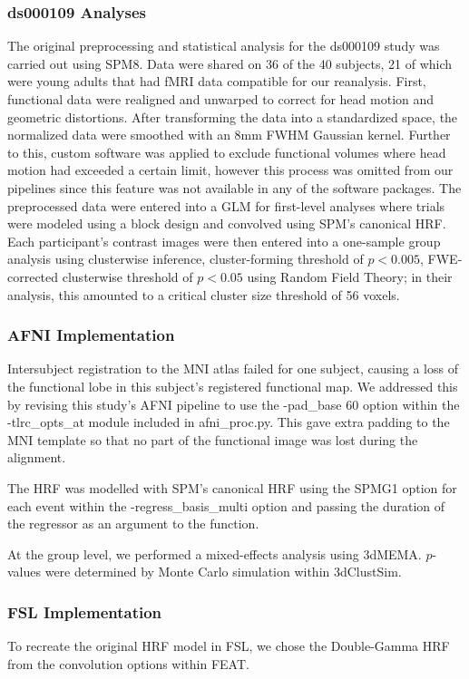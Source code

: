 \subsubsection{ds000109 Analyses}
The original preprocessing and statistical analysis for the ds000109 study was carried out using SPM8. Data were shared on 36 of the 40 subjects, 21 of which were young adults that had fMRI data compatible for our reanalysis. First, functional data were realigned and unwarped to correct for head motion and geometric distortions. After transforming the data into a standardized space, the normalized data were smoothed with an 8mm FWHM Gaussian kernel. Further to this, custom software was applied to exclude functional volumes where head motion had exceeded a certain limit, however this process was omitted from our pipelines since this feature was not available in any of the software packages. The preprocessed data were entered into a GLM for first-level analyses where trials were modeled using a block design and convolved using SPM's canonical HRF. Each participant's contrast images were then entered into a one-sample group analysis using clusterwise inference, cluster-forming threshold of $p < 0.005$, FWE-corrected clusterwise threshold of $p < 0.05$ using Random Field Theory; in their analysis, this amounted to a critical cluster size threshold of 56 voxels. 

\subsubsection{AFNI Implementation}
Intersubject registration to the MNI atlas failed for one subject, causing a loss of the functional lobe in this subject's registered functional map. We addressed this by revising this study's AFNI pipeline to use the -pad\_base 60 option within the -tlrc\_opts\_at module included in afni\_proc.py. This gave extra padding to the MNI template so that no part of the functional image was lost during the alignment. 

The HRF was modelled with SPM's canonical HRF using the SPMG1 option for each event within the -regress\_basis\_multi option and passing the duration of the regressor as an argument to the function.

At the group level, we performed a mixed-effects analysis using 3dMEMA. $p$-values were determined by Monte Carlo simulation within 3dClustSim.

\subsubsection{FSL Implementation}
To recreate the original HRF model in FSL, we chose the Double-Gamma HRF from the convolution options within FEAT. 

